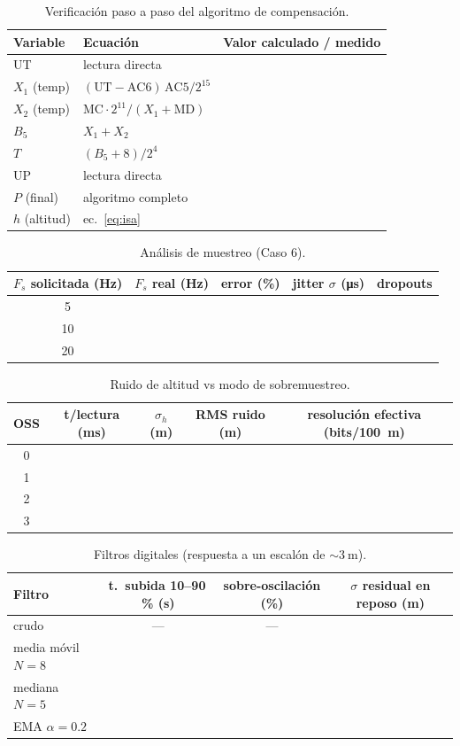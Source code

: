 \documentclass[11pt]{article}
\begin{document}
\begin{table}[H]\centering
\caption{Verificación paso a paso del algoritmo de compensación.}
\begin{tabular}{lll}
\toprule
Variable & Ecuación & Valor calculado / medido \\
\midrule
UT & lectura directa & \\
$X_1$ (temp) & $(\text{UT}-\text{AC6})\,\text{AC5}/2^{15}$ & \\
$X_2$ (temp) & $\text{MC}\cdot 2^{11}/(X_1+\text{MD})$ & \\
$B_5$ & $X_1+X_2$ & \\
$T$ & $(B_5+8)/2^4$ & \\
UP & lectura directa & \\
$P$ (final) & algoritmo completo & \\
$h$ (altitud) & ec.~\eqref{eq:isa} & \\
\bottomrule
\end{tabular}
\end{table}

\begin{table}[H]\centering
\caption{Análisis de muestreo (Caso 6).}
\begin{tabular}{ccccc}
\toprule
$F_s$ solicitada (Hz) & $F_s$ real (Hz) & error (\%) & jitter $\sigma$ (\si{\micro\second}) & dropouts \\
\midrule
5 & & & & \\
10 & & & & \\
20 & & & & \\
\bottomrule
\end{tabular}
\end{table}

\begin{table}[H]\centering
\caption{Ruido de altitud vs modo de sobremuestreo.}
\begin{tabular}{ccccc}
\toprule
OSS & t/lectura (ms) & $\sigma_h$ (m) & RMS ruido (m) & resolución efectiva (bits/\SI{100}{\meter}) \\
\midrule
0 & & & & \\
1 & & & & \\
2 & & & & \\
3 & & & & \\
\bottomrule
\end{tabular}
\end{table}

\begin{table}[H]\centering
\caption{Filtros digitales (respuesta a un escalón de $\sim\SI{3}{\meter}$).}
\begin{tabular}{lccc}
\toprule
Filtro & t.\ subida 10--90\,\% (s) & sobre-oscilación (\%) & $\sigma$ residual en reposo (m) \\
\midrule
crudo & --- & --- & \\
media móvil $N=8$ & & & \\
mediana $N=5$ & & & \\
EMA $\alpha=0.2$ & & & \\
\bottomrule
\end{tabular}
\end{table}
\end{document}
